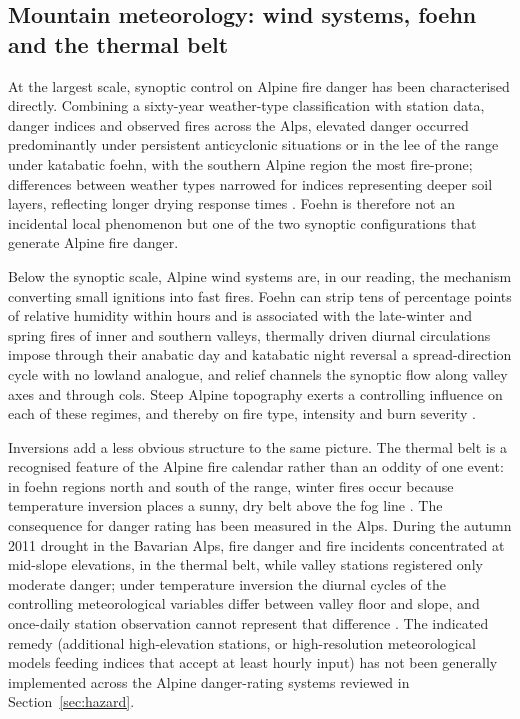 \documentclass[11pt,a4paper]{article}
\begin{document}
\subsection{Mountain meteorology: wind systems, foehn and the thermal belt}

At the largest scale, synoptic control on Alpine fire danger has been characterised directly. Combining a sixty-year weather-type classification with station data, danger indices and observed fires across the Alps, elevated danger occurred predominantly under persistent anticyclonic situations or in the lee of the range under katabatic foehn, with the southern Alpine region the most fire-prone; differences between weather types narrowed for indices representing deeper soil layers, reflecting longer drying response times \citep{wastl_largescale_2013}. Foehn is therefore not an incidental local phenomenon but one of the two synoptic configurations that generate Alpine fire danger.

Below the synoptic scale, Alpine wind systems are, in our reading, the mechanism converting small ignitions into fast fires. Foehn can strip tens of percentage points of relative humidity within hours and is associated with the late-winter and spring fires of inner and southern valleys, thermally driven diurnal circulations impose through their anabatic day and katabatic night reversal a spread-direction cycle with no lowland analogue, and relief channels the synoptic flow along valley axes and through cols. Steep Alpine topography exerts a controlling influence on each of these regimes, and thereby on fire type, intensity and burn severity \citep{melzner_wildfire-induced_2025}.

Inversions add a less obvious structure to the same picture. The thermal belt is a recognised feature of the Alpine fire calendar rather than an oddity of one event: in foehn regions north and south of the range, winter fires occur because temperature inversion places a sunny, dry belt above the fog line \citep{muller_forest_2020}. The consequence for danger rating has been measured in the Alps. During the autumn 2011 drought in the Bavarian Alps, fire danger and fire incidents concentrated at mid-slope elevations, in the thermal belt, while valley stations registered only moderate danger; under temperature inversion the diurnal cycles of the controlling meteorological variables differ between valley floor and slope, and once-daily station observation cannot represent that difference \citep{schunk_forest_2013}. The indicated remedy (additional high-elevation stations, or high-resolution meteorological models feeding indices that accept at least hourly input) has not been generally implemented across the Alpine danger-rating systems reviewed in Section~\ref{sec:hazard}.
\end{document}
